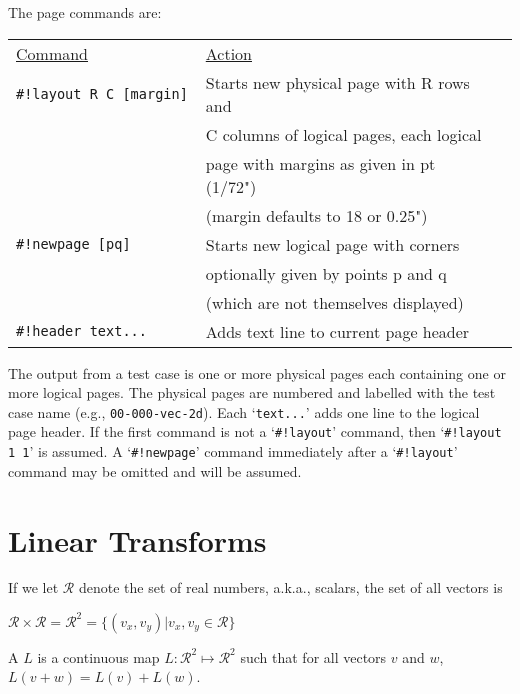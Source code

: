 \documentclass[12pt]{article}
\begin{document}
\begin{minipage}{\textwidth}
The page commands are:
\\[1ex]
\begin{tabular}{@{}l@{~~~~~}l@{~~~~~}l@{}}
\underline{Command} & \underline{Action}
\\[1ex]
\tt \#!layout R C [margin]   & Starts new physical page with R rows and \\
                             & C columns of logical pages, each logical \\
			     & page with margins as given in pt (1/72") \\
			     & (margin defaults to 18 or 0.25") \\
\tt \#!newpage [pq] & Starts new logical page with corners \\
                    & optionally given by points p and q \\
		    & (which are not themselves displayed) \\
\tt \#!header text... & Adds text line to current page header \\
\end{tabular}
\end{minipage}

The output from a test case is one or more physical pages
each containing one or more logical pages.  The physical
pages are numbered and labelled with the test case name
(e.g., {\tt 00-000-vec-2d}).  Each `{\tt text...}' adds one
line to the logical page header.  If the first command is
not a `{\tt \#!layout}' command, then `{\tt \#!layout 1 1}'
is assumed.  A `{\tt \#!newpage}' command immediately after a
`{\tt \#!layout}' command may be omitted and will be assumed.

\newpage

\section{Linear Transforms}
If we let $\mathcal{R}$ denote the set of real numbers,
a.k.a., scalars, the set of all vectors is \\
\centerline{
$\mathcal{R}\times\mathcal{R}=\mathcal{R}^2
    =\{(v_x,v_y)|v_x,v_y\in \mathcal{R}\}$}

\begin{definition}\label{LINEAR-TRANSFORMATION}
A  $L$ is a continuous map
$L:\mathcal{R}^2\mapsto\mathcal{R}^2$ such that for
all vectors $v$ and $w$, $L(v+w)=L(v)+L(w)$.
\end{definition}
\end{document}
